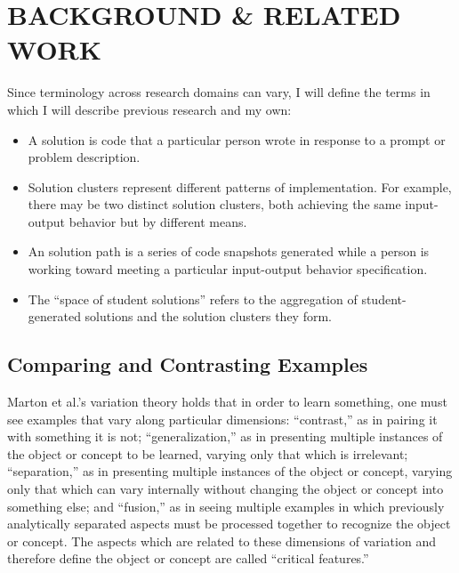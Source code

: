 \documentclass[12pt]{article}
\begin{document}
\section{BACKGROUND \& RELATED WORK}



Since terminology across research domains can vary, I will define the terms in which I will describe previous research and my own: 
\begin{itemize}
\item A solution is code that a particular person wrote in response to a prompt or problem description.
\item Solution clusters represent different patterns of implementation. For example, there may be two distinct solution clusters, both achieving the same input-output behavior but by different means. 
\item An solution path is a series of code snapshots generated while a person is working toward meeting a particular input-output behavior specification. 
\item The ``space of student solutions'' refers to the aggregation of student-generated solutions and the solution clusters they form.
\end{itemize}

\subsection{Comparing and Contrasting Examples}


Marton et al.'s variation theory \cite{Marton13} holds that in order to learn something, one must see examples that vary along particular dimensions: ``contrast,'' as in pairing it with something it is not; ``generalization,'' as in presenting multiple instances of the object or concept to be learned, varying only that which is irrelevant; ``separation,'' as in presenting multiple instances of the object or concept, varying only that which can vary internally without changing the object or concept into something else; and ``fusion,'' as in seeing multiple examples in which previously analytically separated aspects must be processed together to recognize the object or concept. The aspects which are related to these dimensions of variation and therefore define the object or concept are called ``critical features.''
\end{document}

